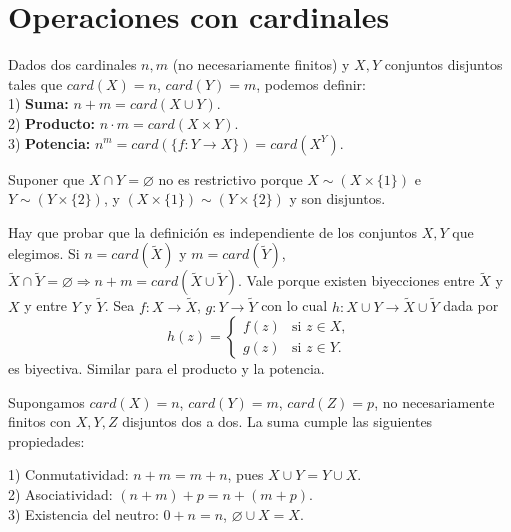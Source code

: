 \section{Operaciones con cardinales}

Dados dos cardinales $n,m$ (no necesariamente finitos) y $X, Y$ conjuntos
disjuntos tales que $card(X) = n$, $card(Y) = m$, podemos definir: \\

1) \textbf{Suma:} $n+m = card(X \cup Y)$. \\
2) \textbf{Producto:} $n \cdot m = card(X \times Y)$. \\
3) \textbf{Potencia:} $n^m = card(\{ f: Y \to X \}) = card(X^Y)$.

\begin{note}
    Suponer que $X \cap Y = \varnothing$ no es restrictivo porque $X \sim (X \times \{1\})$ e $Y \sim (Y \times \{ 2\})$, y $(X \times \{1\}) \sim (Y \times \{ 2\})$ y son disjuntos.
\end{note}

\begin{note}
    Hay que probar que la definición es independiente de los conjuntos $X, Y$ que elegimos.
    Si $n = card(\tilde{X})$ y $m = card(\tilde{Y})$, $\tilde{X} \cap \tilde{Y} = \varnothing \Rightarrow n+m=card(\tilde{X} \cup \tilde{Y})$. Vale porque existen biyecciones entre $\tilde{X}$ y $X$ y entre $Y$ y $\tilde{Y}$.
    Sea $f: X \to \tilde{X}$, $g:Y \to \tilde{Y}$ con lo cual $h: X \cup Y \to \tilde{X} \cup \tilde{Y}$ dada por
    \[
        h(z) = \begin{cases}
            f(z) & \text{si } z \in X,  \\
            g(z) & \text{si } z \in Y.
        \end{cases}
    \]
    es biyectiva.
    Similar para el producto y la potencia.
\end{note}

Supongamos $card(X) = n$, $card(Y) = m$, $card(Z) = p$, no necesariamente
finitos con $X, Y, Z$ disjuntos dos a dos. La suma cumple las siguientes
propiedades:

\begin{prop}
    1) Conmutatividad: $n+m=m+n$, pues $X \cup Y = Y \cup X$. \\
    2) Asociatividad: $(n+m)+p=n+(m+p)$. \\
    3) Existencia del neutro: $0+n=n$, $\varnothing \cup X=X$. \\
\end{prop}

